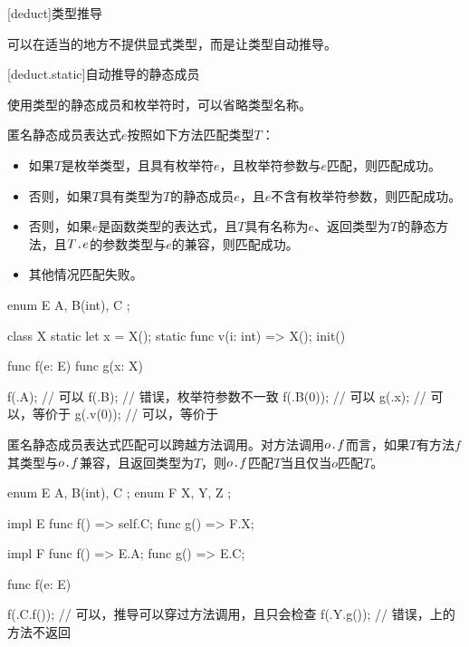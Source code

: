 
[deduct]{类型推导}

\pnum
\X 可以在适当的地方不提供显式类型，而是让类型自动推导。

[deduct.static]{自动推导的静态成员}

\pnum
使用类型的静态成员和枚举符时，可以省略类型名称。

\pnum
匿名静态成员表达式$e$按照如下方法匹配类型$T$：

\begin{itemize}
    \item 如果$T$是枚举类型，且具有枚举符$e$，且枚举符参数与$e$匹配，则匹配成功。
    \item 否则，如果$T$具有类型为$T$的静态成员$e$，且$e$不含有枚举符参数，则匹配成功。
    \item 否则，如果$e$是函数类型的表达式，且$T$具有名称为$e$、返回类型为$T$的静态方法，且$T\texttt{.}e$的参数类型与$e$的兼容，则匹配成功。
    \item 其他情况匹配失败。
\end{itemize}

\enterexample
\begin{codeblock}
enum E { A, B(int), C };

class X {
    static let x = X();
    static func v(i: int) => X();
    init() { }
}

func f(e: E) { }
func g(x: X) { }

f(.A); // 可以
f(.B); // 错误，枚举符参数不一致
f(.B(0)); // 可以
g(.x); // 可以，等价于
g(.v(0)); // 可以，等价于

\end{codeblock}
\exitexample

\pnum
匿名静态成员表达式匹配可以跨越方法调用。对方法调用$o\texttt{.}f$而言，如果$T$有方法$f$其类型与$o\texttt{.}f$兼容，且返回类型为$T$，则$o\texttt{.}f$匹配$T$当且仅当$o$匹配$T$。

\enterexample
\begin{codeblock}
enum E { A, B(int), C };
enum F { X, Y, Z };

impl E {
    func f() => self.C;
    func g() => F.X;
}

impl F {
    func f() => E.A;
    func g() => E.C;
}

func f(e: E) { }

f(.C.f()); // 可以，推导可以穿过方法调用，且只会检查
f(.Y.g()); // 错误，上的方法不返回

\end{codeblock}
\exitexample